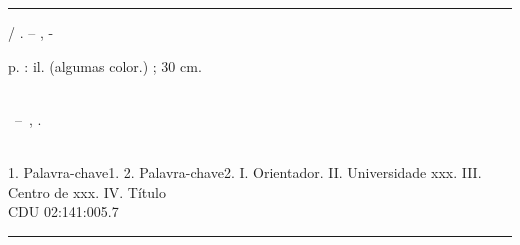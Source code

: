 %
%     

\begin{fichacatalografica}
	\vspace*{\fill}					%
	\hrule							%
	\begin{center}					%
	\begin{minipage}[c]{12.5cm}		%
	
	\imprimirautor
	
	\hspace{0.5cm} \imprimirtitulo  / \imprimirautor. --
	\imprimirlocal, \imprimirdata-
	
	\hspace{0.5cm} \pageref{LastPage} p. : il. (algumas color.) ; 30 cm.\\
	
	\hspace{0.5cm} \imprimirorientadorRotulo~\imprimirorientador\\
	
	\hspace{0.5cm}
	\parbox[t]{\textwidth}{\imprimirtipotrabalho~--~\imprimirinstituicao,
	\imprimirdata.}\\
	
	\hspace{0.5cm}
		1. Palavra-chave1.
		2. Palavra-chave2.
		I. Orientador.
		II. Universidade xxx.
		III. Centro de xxx.
		IV. Título\\ 			
	
	\hspace{8.75cm} CDU 02:141:005.7\\
	
	\end{minipage}
	\end{center}
	\hrule
\end{fichacatalografica}

